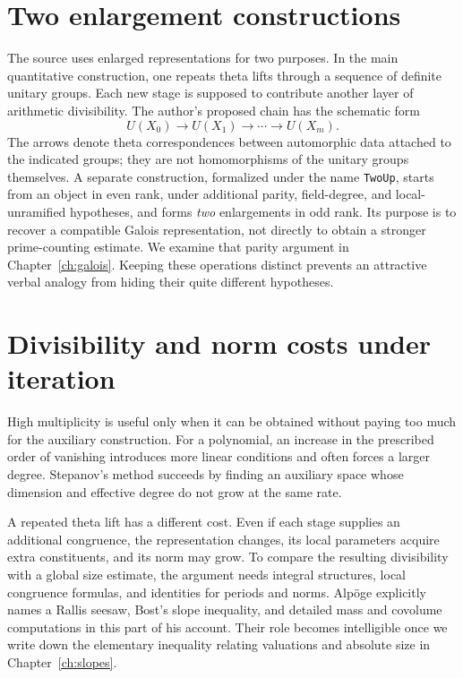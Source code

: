 \documentclass[11pt,openany,oneside]{scrbook}
\theoremstyle{definition}
\theoremstyle{remark}
\begin{document}
\section{Two enlargement constructions}
The source uses enlarged representations for two purposes. In the main quantitative construction, one repeats theta lifts through a sequence of definite unitary groups. Each new stage is supposed to contribute another layer of arithmetic divisibility. The author's proposed chain has the schematic form
\[
U(X_0)\longrightarrow U(X_1)\longrightarrow\cdots\longrightarrow U(X_m).
\]
The arrows denote theta correspondences between automorphic data attached to the indicated groups; they are not homomorphisms of the unitary groups themselves.
A separate construction, formalized under the name \texttt{TwoUp}, starts from an object in even rank, under additional parity, field-degree, and local-unramified hypotheses, and forms \emph{two} enlargements in odd rank. Its purpose is to recover a compatible Galois representation, not directly to obtain a stronger prime-counting estimate. We examine that parity argument in Chapter~\ref{ch:galois}. Keeping these operations distinct prevents an attractive verbal analogy from hiding their quite different hypotheses.

\section{Divisibility and norm costs under iteration}
High multiplicity is useful only when it can be obtained without paying too much for the auxiliary construction. For a polynomial, an increase in the prescribed order of vanishing introduces more linear conditions and often forces a larger degree. Stepanov's method succeeds by finding an auxiliary space whose dimension and effective degree do not grow at the same rate.

A repeated theta lift has a different cost. Even if each stage supplies an additional congruence, the representation changes, its local parameters acquire extra constituents, and its norm may grow. To compare the resulting divisibility with a global size estimate, the argument needs integral structures, local congruence formulas, and identities for periods and norms. Alp\"oge explicitly names a Rallis seesaw, Bost's slope inequality, and detailed mass and covolume computations in this part of his account. Their role becomes intelligible once we write down the elementary inequality relating valuations and absolute size in Chapter~\ref{ch:slopes}.
\end{document}
